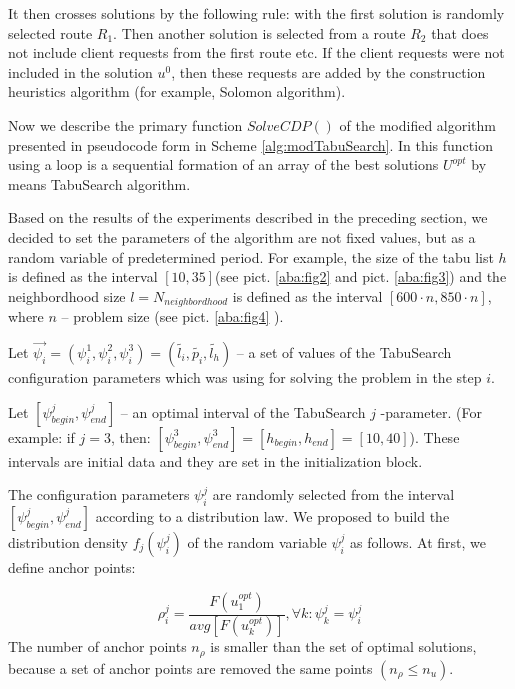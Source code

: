 \documentclass[]{TAACpaper}
\begin{document}
It then crosses solutions by the following rule: with the first solution is randomly selected route $R_1$. Then another solution is selected from a route $R_2$ that does not include client requests from the first  route etc. If the client requests were not included in the solution $u^0$, then these requests are added by the construction heuristics algorithm (for example, Solomon algorithm).


Now we describe the primary function $SolveCDP()$ of the modified algorithm presented in pseudocode form in Scheme \ref{alg:modTabuSearch}. In this function using a loop is a sequential formation of an array of the best solutions $U^{opt}$ by means TabuSearch algorithm.   

Based on the results of the experiments described in the preceding section, we decided to set the parameters of the algorithm are not fixed values, but as a random variable of predetermined period. For example, the size of the tabu list $h$ is defined as the interval $[10,35]$(see pict. \ref{aba:fig2} and  pict. \ref{aba:fig3}) and the neighbordhood size $l=N_{neighbordhood}$ is defined as the interval $[600\cdot n,850\cdot n]$, where $n$ -- problem size (see pict. \ref{aba:fig4} ).

Let $\vec{\psi_i} = (\psi^1_i,\psi^2_i,\psi^3_i) = (\tilde{l_i},\tilde{p_i},\tilde{l_h})$ -- a set of values of the TabuSearch configuration parameters which was using for solving the problem in the step $i$.

Let $[\psi^j_{begin}, \psi^j_{end}]$ -- an optimal interval of the TabuSearch $j$ -parameter. (For example: if $j=3$, then: $[\psi^3_{begin}, \psi^3_{end}]= [h_{begin}, h_{end}] = [10, 40] $). These intervals are initial data and they are set in the initialization block. 

The configuration parameters  $\psi^j_i $ are randomly selected from the interval $[\psi^j_{begin}, \psi^j_{end}]$ according to a distribution law. We proposed to build the distribution density $f_j(\psi^j_i)$ of the random variable $\psi^j_i$ as follows. At first, we define anchor points:
 
 \begin{equation} \label{anchor_points}
     \rho^j_i =  \dfrac{F(u^{opt}_1)}{avg[F(u^{opt}_k)]}, \forall k: \psi^j_k = \psi^j_i
 \end{equation}
 The number of anchor points $n_{\rho}$  is smaller than the set of optimal solutions, because a set of  anchor points are removed the same points $(n_{\rho} \leq  n_u)$.
 
\end{document}
